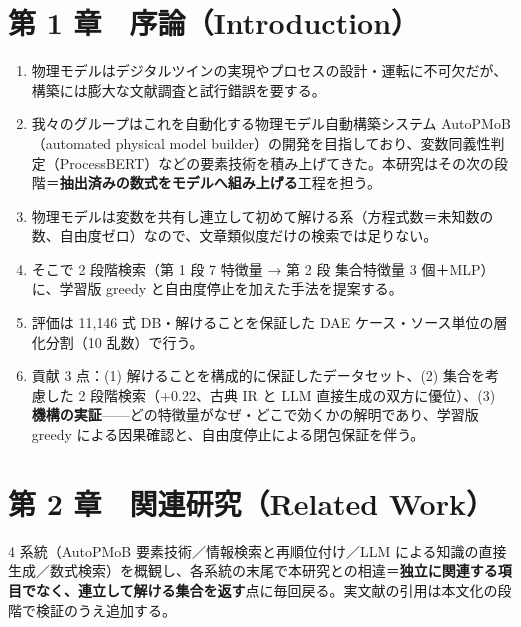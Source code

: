 \documentclass[11pt,a4paper]{ltjsarticle}
\begin{document}
\section*{第 1 章　序論（Introduction）}
\begin{enumerate}
  \item 物理モデルはデジタルツインの実現やプロセスの設計・運転に不可欠だが、構築には膨大な文献調査と試行錯誤を要する。
  \item 我々のグループはこれを自動化する物理モデル自動構築システム AutoPMoB（automated physical model builder）の開発を目指しており、変数同義性判定（ProcessBERT）などの要素技術を積み上げてきた。本研究はその次の段階＝\textbf{抽出済みの数式をモデルへ組み上げる}工程を担う。
  \item 物理モデルは変数を共有し連立して初めて解ける系（方程式数＝未知数の数、自由度ゼロ）なので、文章類似度だけの検索では足りない。
  \item そこで 2 段階検索（第 1 段 7 特徴量 → 第 2 段 集合特徴量 3 個＋MLP）に、学習版 greedy と自由度停止を加えた手法を提案する。
  \item 評価は 11{,}146 式 DB・解けることを保証した DAE ケース・ソース単位の層化分割（10 乱数）で行う。
  \item 貢献 3 点：(1) 解けることを構成的に保証したデータセット、(2) 集合を考慮した 2 段階検索（+0.22、古典 IR と LLM 直接生成の双方に優位）、(3) \textbf{機構の実証}——どの特徴量がなぜ・どこで効くかの解明であり、学習版 greedy による因果確認と、自由度停止による閉包保証を伴う。
\end{enumerate}

\section*{第 2 章　関連研究（Related Work）}
4 系統（AutoPMoB 要素技術／情報検索と再順位付け／LLM による知識の直接生成／数式検索）を概観し、各系統の末尾で本研究との相違＝\textbf{独立に関連する項目でなく、連立して解ける集合を返す}点に毎回戻る。実文献の引用は本文化の段階で検証のうえ追加する。

\end{document}
